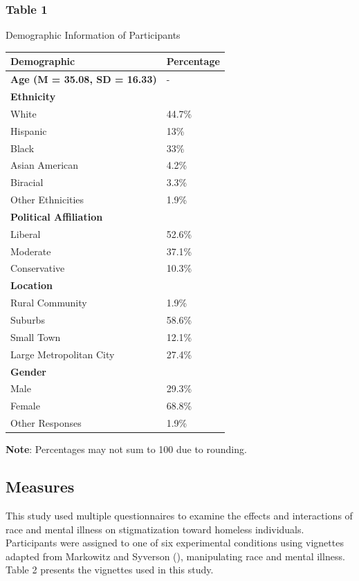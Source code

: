 \documentclass[
  man,
  floatsintext,
  longtable,
  nolmodern,
  notxfonts,
  notimes,
  colorlinks=true,linkcolor=blue,citecolor=blue,urlcolor=blue]{apa7}
\begin{document}
\subsubsection{Table 1}\label{table-1}

Demographic Information of Participants

\begin{longtable}[]{@{}ll@{}}
\toprule\noalign{}
\textbf{Demographic} & \textbf{Percentage} \\
\midrule\noalign{}
\endhead
\bottomrule\noalign{}
\endlastfoot
\textbf{Age (M = 35.08, SD = 16.33)} & - \\
\textbf{Ethnicity} & \\
White & 44.7\% \\
Hispanic & 13\% \\
Black & 33\% \\
Asian American & 4.2\% \\
Biracial & 3.3\% \\
Other Ethnicities & 1.9\% \\
\textbf{Political Affiliation} & \\
Liberal & 52.6\% \\
Moderate & 37.1\% \\
Conservative & 10.3\% \\
\textbf{Location} & \\
Rural Community & 1.9\% \\
Suburbs & 58.6\% \\
Small Town & 12.1\% \\
Large Metropolitan City & 27.4\% \\
\textbf{Gender} & \\
Male & 29.3\% \\
Female & 68.8\% \\
Other Responses & 1.9\% \\
\end{longtable}

\textbf{Note}: Percentages may not sum to 100 due to rounding.

\subsection{Measures}\label{measures}

This study used multiple questionnaires to examine the effects and
interactions of race and mental illness on stigmatization toward
homeless individuals. Participants were assigned to one of six
experimental conditions using vignettes adapted from Markowitz and
Syverson (),
manipulating race and mental illness. Table 2 presents the vignettes
used in this study.
\end{document}
